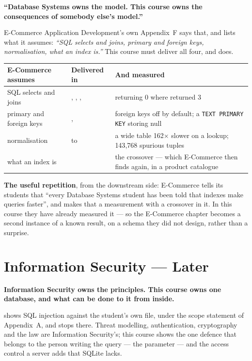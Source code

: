 \begin{conceptbox}
\textbf{``Database Systems owns the model. This course owns the consequences of
somebody else's model.''}

\smallskip
E-Commerce Application Development's own Appendix~F says that, and lists what
it assumes: \emph{``SQL selects and joins, primary and foreign keys,
normalisation, what an index is.''} This course must deliver all four, and
does.
\end{conceptbox}

\begin{longtable}{@{}L{4.6cm}L{4.6cm}L{5.2cm}@{}}
\toprule
{}
\textbf{E-Commerce assumes} & \textbf{Delivered in} & \textbf{And measured} \\
\midrule
\endhead
SQL selects and joins & , , ,
   &  returning 0 where 
  returned 3 \\
primary and foreign keys & ,  & foreign
  keys off by default; a \texttt{TEXT PRIMARY KEY} storing null \\
normalisation &  to  & a wide table
  162$\times$ slower on a lookup; 143{,}768 spurious tuples \\
what an index is &  & the crossover --- which E-Commerce
  then finds again, in a product catalogue \\
\bottomrule
\end{longtable}

\smallskip
\textbf{The useful repetition}, from the downstream side: E-Commerce tells its
students that ``every Database Systems student has been told that indexes make
queries faster'', and makes that a measurement with a crossover in it. In this
course they have already measured it --- so the E-Commerce chapter becomes a
second instance of a known result, on a schema they did not design, rather than
a surprise.

\section{Information Security --- Later}

\begin{conceptbox}
\textbf{Information Security owns the principles. This course owns one
database, and what can be done to it from inside.}

\smallskip
{} shows SQL injection against the student's own file, under the
scope statement of Appendix~A, and stops there. Threat modelling,
authentication, cryptography and the law are Information Security's; this
course shows the one defence that belongs to the person writing the query ---
the parameter --- and the access control a server adds that SQLite lacks.
\end{conceptbox}


